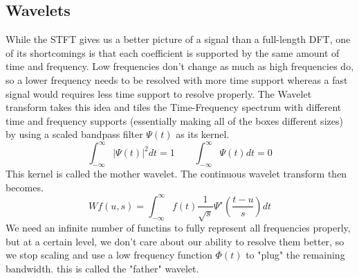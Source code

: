 \documentclass{article}
\begin{document}
\subsection{Wavelets}
While the STFT gives us a better picture of a signal than a full-length DFT, one of its shortcomings is that each coefficient is supported by the same amount of time and frequency. Low frequencies don't change as
much as high frequencies do, so a lower frequency needs to be resolved with more time support whereas a fast signal would requires less time support to resolve properly.
The Wavelet transform takes this idea and tiles the Time-Frequency spectrum with different time and frequency supports (essentially making all of the boxes different sizes) by using a scaled bandpass filter $\Psi(t)$ as its kernel.
$$\int_{-\infty}^{\infty}|\Psi(t)|^2dt=1 \qquad \int_{-\infty}^{\infty}\Psi(t)dt = 0$$
This kernel is called the mother wavelet. The continuous wavelet transform then becomes.
$$Wf(u, s) = \int_{-\infty}^{\infty}f(t)\frac{1}{\sqrt{s}}\Psi^\star\left(\frac{t-u}{s}\right)dt$$
We need an infinite number of functins to fully represent all frequencies properly, but at a certain level, we don't care about our ability to resolve them better, so we stop scaling and
use a low frequency function $\Phi(t)$ to "plug" the remaining bandwidth. this is called the "father" wavelet.
\end{document}
